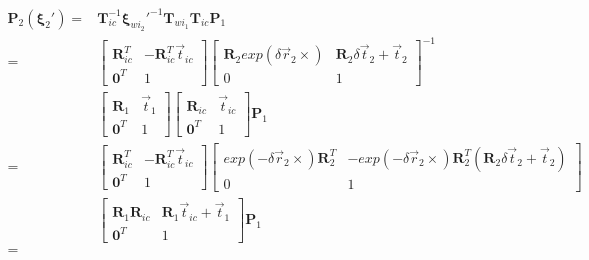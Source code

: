 \documentclass{article}
\begin{document}
\begin{equation}
	\begin{aligned}
		\boldsymbol{P}_2(\boldsymbol{\xi}_2')     = & \boldsymbol{T}_{ic}^{-1}\boldsymbol{\xi}_{wi_2}'^{-1}\boldsymbol{T}_{wi_1}\boldsymbol{T}_{ic}\boldsymbol{P}_1 \\=&
		\left[
		\begin{matrix}
		\boldsymbol{R}_{ic}^T                       & -\boldsymbol{R}_{ic}^T\vec{t}_{ic}\\
		\boldsymbol{0}^T                            & 1                                                                                                            
		\end{matrix}
		\right]
		\left[
		\begin{matrix}
		\boldsymbol{R}_2exp(\delta \vec{r}_2\times)& \boldsymbol{R}_2\delta\vec{t}_2+\vec{t}_2\\
		0&1 
		\end{matrix} 
		\right]^{-1} \\&
		\left[ 
		\begin{matrix}  
		\boldsymbol{R}_1& \vec{t}_1\\ 
		\boldsymbol{0}^T&1
		\end{matrix}
		\right]   
		\left[ 
		\begin{matrix}  
		\boldsymbol{R}_{ic}& \vec{t}_{ic}\\ 
		\boldsymbol{0}^T&1
		\end{matrix}
		\right]   
		\boldsymbol{P}_1\\=&
		\left[
		\begin{matrix}
		\boldsymbol{R}_{ic}^T& -\boldsymbol{R}_{ic}^T\vec{t}_{ic}\\
		\boldsymbol{0}^T& 1                                                                                                            
		\end{matrix}
		\right]
		\left[ 
		\begin{matrix}
		exp(-\delta \vec{r}_2\times)\boldsymbol{R}_2^{T}& -exp(-\delta \vec{r}_2\times)\boldsymbol{R}_2^{T}(\boldsymbol{R}_2\delta\vec{t}_2+\vec{t}_2)\\
		0&1 
		\end{matrix} 
		\right] \\&
		\left[ 
		\begin{matrix} 
		\boldsymbol{R}_1\boldsymbol{R}_{ic}& \boldsymbol{R}_1\vec{t}_{ic}+\vec{t}_1\\ 
		\boldsymbol{0}^T&1
		\end{matrix}
		\right]   
		\boldsymbol{P}_1\\=&

\end{aligned}
\end{equation}
\end{document}
